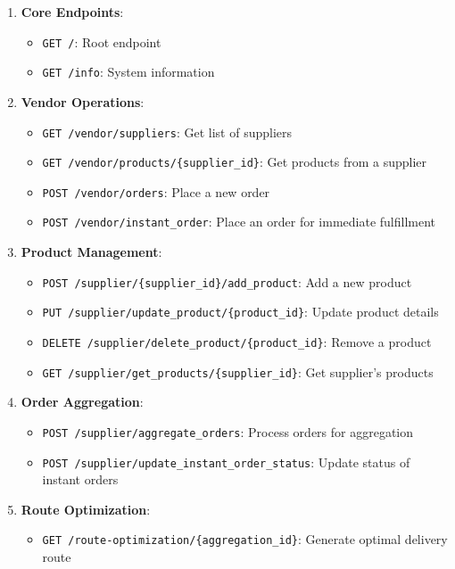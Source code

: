 \begin{enumerate}
    \item \textbf{Core Endpoints}:
          \begin{itemize}
              \item \texttt{GET /}: Root endpoint
              \item \texttt{GET /info}: System information
          \end{itemize}

    \item \textbf{Vendor Operations}:
          \begin{itemize}
              \item \texttt{GET /vendor/suppliers}: Get list of suppliers
              \item \texttt{GET /vendor/products/\{supplier\_id\}}: Get products from a supplier
              \item \texttt{POST /vendor/orders}: Place a new order
              \item \texttt{POST /vendor/instant\_order}: Place an order for immediate fulfillment
          \end{itemize}

    \item \textbf{Product Management}:
          \begin{itemize}
              \item \texttt{POST /supplier/\{supplier\_id\}/add\_product}: Add a new product
              \item \texttt{PUT /supplier/update\_product/\{product\_id\}}: Update product details
              \item \texttt{DELETE /supplier/delete\_product/\{product\_id\}}: Remove a product
              \item \texttt{GET /supplier/get\_products/\{supplier\_id\}}: Get supplier's products
          \end{itemize}

    \item \textbf{Order Aggregation}:
          \begin{itemize}
              \item \texttt{POST /supplier/aggregate\_orders}: Process orders for aggregation
              \item \texttt{POST /supplier/update\_instant\_order\_status}: Update status of instant orders
          \end{itemize}

    \item \textbf{Route Optimization}:
          \begin{itemize}
              \item \texttt{GET /route-optimization/\{aggregation\_id\}}: Generate optimal delivery route
          \end{itemize}


\end{enumerate}
